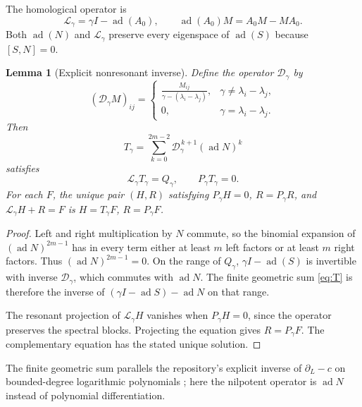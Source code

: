 \documentclass[11pt,a4paper]{article}
\numberwithin{equation}{section}
\newtheorem{lemma}[theorem]{Lemma}
\theoremstyle{definition}
\theoremstyle{remark}
\newcommand{\ad}{\operatorname{ad}}
\newcommand{\Dg}{\mathcal D}
\begin{document}
The homological operator is
\[
 \mathcal L_\gamma=\gamma I-\ad(A_0),\qquad
 \ad(A_0)M=A_0M-MA_0.
\]
Both $\ad(N)$ and $\mathcal L_\gamma$ preserve every eigenspace of
$\ad(S)$ because $[S,N]=0$.

\begin{lemma}[Explicit nonresonant inverse]\label{lem:inverse}
Define the operator $\Dg_\gamma$ by
\[
 (\Dg_\gamma M)_{ij}=
 \begin{cases}
 \displaystyle\frac{M_{ij}}{\gamma-(\lambda_i-\lambda_j)},
    &\gamma\ne\lambda_i-\lambda_j,\\[6pt]
 0,&\gamma=\lambda_i-\lambda_j.
 \end{cases}
\]
Then
\begin{equation}\label{eq:T}
 T_\gamma=\sum_{k=0}^{2m-2}
       \Dg_\gamma^{\,k+1}(\ad N)^k
\end{equation}
satisfies
\[
 \mathcal L_\gamma T_\gamma=Q_\gamma,
 \qquad P_\gamma T_\gamma=0.
\]
For each $F$, the unique pair $(H,R)$ satisfying
$P_\gamma H=0$, $R=P_\gamma R$, and
$\mathcal L_\gamma H+R=F$ is
$H=T_\gamma F$, $R=P_\gamma F$.
\end{lemma}
\begin{proof}
Left and right multiplication by $N$ commute, so the binomial expansion of
$(\ad N)^{2m-1}$ has in every term either at least $m$ left factors or at
least $m$ right factors. Thus $(\ad N)^{2m-1}=0$. On the range of
$Q_\gamma$, $\gamma I-\ad(S)$ is invertible with inverse
$\Dg_\gamma$, which commutes with $\ad N$. The finite geometric sum
\eqref{eq:T} is therefore the inverse of
$(\gamma I-\ad S)-\ad N$ on that range.

The resonant projection of $\mathcal L_\gamma H$ vanishes when
$P_\gamma H=0$, since the operator preserves the spectral blocks.
Projecting the equation gives $R=P_\gamma F$. The complementary equation
has the stated unique solution.
\end{proof}

The finite geometric sum parallels the repository's explicit inverse of
$\partial_L-c$ on bounded-degree logarithmic polynomials
\cite{repo-block}; here the nilpotent operator is $\ad N$ instead of
polynomial differentiation.
\end{document}
